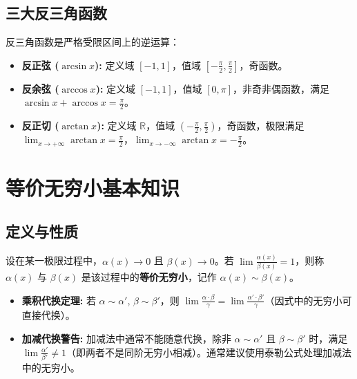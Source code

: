 \documentclass{article}
\begin{document}
\subsection{三大反三角函数}
反三角函数是严格受限区间上的逆运算：
\begin{itemize}[leftmargin=1.5em, itemsep=0.1em]
    \item \textbf{反正弦 ($\arcsin x$):} 定义域 $[-1, 1]$，值域 $\left[-\frac{\pi}{2}, \frac{\pi}{2}\right]$，奇函数。
    \item \textbf{反余弦 ($\arccos x$):} 定义域 $[-1, 1]$，值域 $[0, \pi]$，非奇非偶函数，满足 $\arcsin x + \arccos x = \frac{\pi}{2}$。
    \item \textbf{反正切 ($\arctan x$):} 定义域 $\mathbb{R}$，值域 $\left(-\frac{\pi}{2}, \frac{\pi}{2}\right)$，奇函数，极限满足 $\lim_{x \to +\infty} \arctan x = \frac{\pi}{2}$，$\lim_{x \to -\infty} \arctan x = -\frac{\pi}{2}$。
\end{itemize}
\section{等价无穷小基本知识}

\subsection{定义与性质}
设在某一极限过程中，$\alpha(x) \to 0$ 且 $\beta(x) \to 0$。若 $\lim \frac{\alpha(x)}{\beta(x)} = 1$，则称 $\alpha(x)$ 与 $\beta(x)$ 是该过程中的\textbf{等价无穷小}，记作 $\alpha(x) \sim \beta(x)$。
\begin{itemize}[leftmargin=1.5em]
    \item \textbf{乘积代换定理:} 若 $\alpha \sim \alpha'$, $\beta \sim \beta'$，则 $\lim \frac{\alpha \cdot \beta}{\gamma} = \lim \frac{\alpha' \cdot \beta'}{\gamma}$（因式中的无穷小可直接代换）。
    \item \textbf{加减代换警告:} 加减法中通常不能随意代换，除非 $\alpha \sim \alpha'$ 且 $\beta \sim \beta'$ 时，满足 $\lim \frac{\alpha'}{\beta'} \neq 1$（即两者不是同阶无穷小相减）。通常建议使用泰勒公式处理加减法中的无穷小。
\end{itemize}
\end{document}
